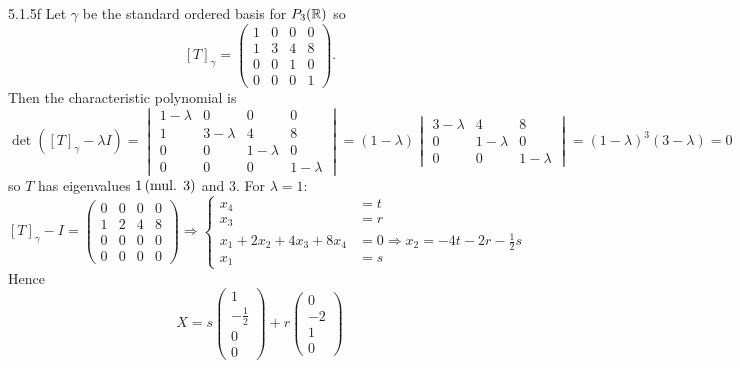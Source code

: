 \documentclass{exam}
\begin{document}
  \begin{problem}{5.1.5f}
    Let $\gamma$ be the standard ordered basis for $P_3(\mathbb R)$ so 
    \[
      [T]_\gamma = \begin{pmatrix}
        1 & 0 & 0 & 0 \\
        1 & 3 & 4 & 8 \\
        0 & 0 & 1 & 0 \\
        0 & 0 & 0 & 1
      \end{pmatrix}.
    \]
    Then the characteristic polynomial is 
    \[
      \det([T]_\gamma - \lambda I) = \begin{vmatrix}
        1 - \lambda & 0 & 0 & 0 \\
        1 & 3 - \lambda & 4 & 8 \\
        0 & 0 & 1 - \lambda & 0 \\
        0 & 0 & 0 & 1 - \lambda 
      \end{vmatrix}
      = (1 - \lambda)\begin{vmatrix}
        3 - \lambda & 4 & 8 \\
        0 & 1 - \lambda & 0 \\
        0 & 0 & 1 - \lambda 
      \end{vmatrix}
      = (1 - \lambda)^3(3 - \lambda) = 0
    \]
    so $T$ has eigenvalues $1 \,(\text{mul. } 3)$ and $3$. For $\lambda = 1$:
    \[
      [T]_\gamma - I = \begin{pmatrix}
        0 & 0 & 0 & 0 \\
        1 & 2 & 4 & 8 \\
        0 & 0 & 0 & 0 \\
        0 & 0 & 0 & 0 
      \end{pmatrix}
      \Rightarrow \begin{cases}
        x_4 &= t \\
        x_3 &= r \\
        x_1 + 2x_2 + 4x_3 + 8x_4 &= 0 \Rightarrow x_2 = -4t - 2r - \frac{1}{2}s\\
        x_1 &= s
      \end{cases}
    \]
    Hence 
    \[
      X = s\begin{pmatrix}
        1 \\ -\frac{1}{2} \\ 0 \\ 0 
      \end{pmatrix}
      + r\begin{pmatrix}
        0 \\ -2 \\ 1 \\ 0

\end{pmatrix}\]
\end{problem}
\end{document}

